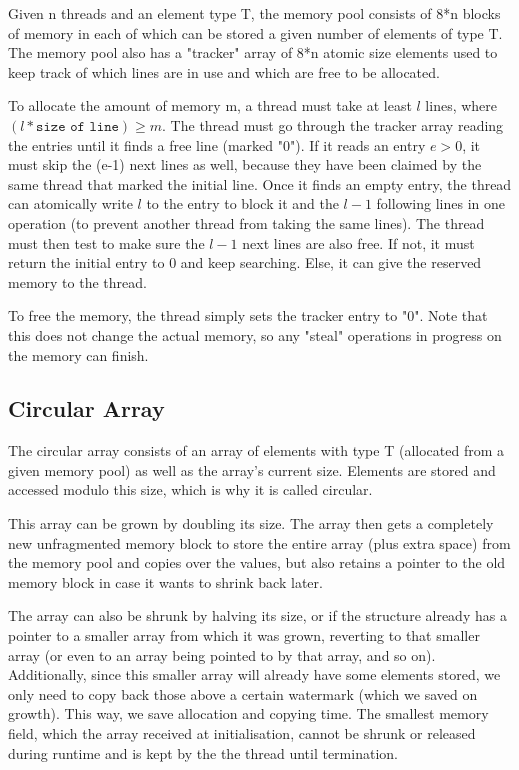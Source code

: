 \documentclass [10pt]{scrartcl}
\begin{document}
   
   Given n threads and an element type T, the memory pool consists of 8*n blocks of memory in each of which can be stored a given number of elements of type T. The memory pool also has a "tracker" array of 8*n atomic size elements used to keep track of which lines are in use and which are free to be allocated.
   
   
   To allocate the amount of memory m, a thread must take at least $l$ lines, where $(l*\texttt{size of line}) \geq m$. The thread must go through the tracker array reading the entries until it finds a free line (marked "0"). If it reads an entry $e > 0$, it must skip the (e-1) next lines as well, because they have been claimed by the same thread that marked the initial line. Once it finds an empty entry, the thread can atomically write $l$ to the entry to block it and the $l-1$ following lines in one operation (to prevent another thread from taking the same lines). The thread must then test to make sure the $l-1$ next lines are also free. If not, it must return the initial entry to 0 and keep searching. Else, it can give the reserved memory to the thread.
   
   To free the memory, the thread simply sets the tracker entry to "0". Note that this does not change the actual memory, so any "steal" operations in progress on the memory can finish.
   \newline
   \subsection{Circular Array}
   
   The circular array consists of an array of elements with type T (allocated from a given memory pool) as well as the array's current size. Elements are stored and accessed modulo this size, which is why it is called circular.
   
   This array can be grown by doubling its size. The array then gets a completely new  unfragmented memory block to store the entire array (plus extra space) from the memory pool and copies over the values, but also retains a pointer to the old memory block in case it wants to shrink back later. 
   
   The array can also be shrunk by halving its size, or if the structure already has a pointer to a smaller array from which it was grown, reverting to that smaller array (or even to an array being pointed to by that array, and so on). Additionally, since this smaller array will already have some elements stored, we only need to copy back those above a certain watermark (which we saved on growth). This way, we save allocation and copying time. The smallest memory field, which the array received at initialisation, cannot be shrunk or released during runtime and is kept by the the thread until termination.
   
\end{document}
